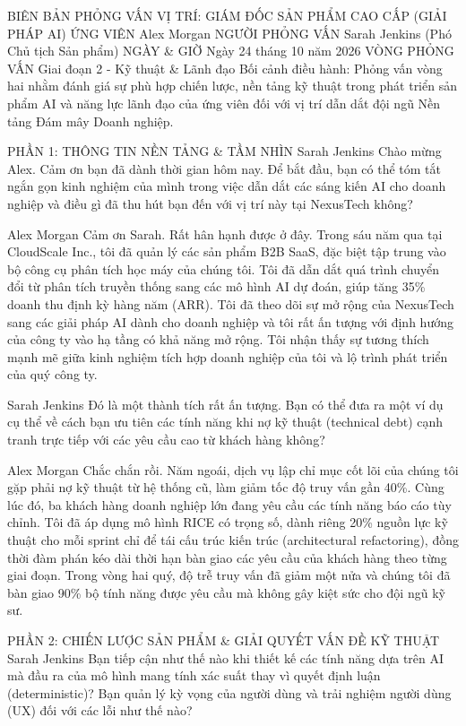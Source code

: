 \documentclass[12pt]{article}
\begin{document}
BIÊN BẢN PHỎNG VẤN
VỊ TRÍ: GIÁM ĐỐC SẢN PHẨM CAO CẤP (GIẢI PHÁP AI)
ỨNG VIÊN
Alex Morgan
NGƯỜI PHỎNG VẤN
Sarah Jenkins (Phó Chủ tịch Sản phẩm)
NGÀY \& GIỜ
Ngày 24 tháng 10 năm 2026
VÒNG PHỎNG VẤN
Giai đoạn 2 - Kỹ thuật \& Lãnh đạo
Bối cảnh điều hành: Phỏng vấn vòng hai nhằm đánh giá sự phù hợp chiến lược, nền tảng kỹ thuật trong phát triển sản phẩm AI và năng lực lãnh đạo của ứng viên đối với vị trí dẫn dắt đội ngũ Nền tảng Đám mây Doanh nghiệp.

PHẦN 1: THÔNG TIN NỀN TẢNG \& TẦM NHÌN
Sarah Jenkins
Chào mừng Alex. Cảm ơn bạn đã dành thời gian hôm nay. Để bắt đầu, bạn có thể tóm tắt ngắn gọn kinh nghiệm của mình trong việc dẫn dắt các sáng kiến AI cho doanh nghiệp và điều gì đã thu hút bạn đến với vị trí này tại NexusTech không?

Alex Morgan
Cảm ơn Sarah. Rất hân hạnh được ở đây. Trong sáu năm qua tại CloudScale Inc., tôi đã quản lý các sản phẩm B2B SaaS, đặc biệt tập trung vào bộ công cụ phân tích học máy của chúng tôi. Tôi đã dẫn dắt quá trình chuyển đổi từ phân tích truyền thống sang các mô hình AI dự đoán, giúp tăng 35\% doanh thu định kỳ hàng năm (ARR). Tôi đã theo dõi sự mở rộng của NexusTech sang các giải pháp AI dành cho doanh nghiệp và tôi rất ấn tượng với định hướng của công ty vào hạ tầng có khả năng mở rộng. Tôi nhận thấy sự tương thích mạnh mẽ giữa kinh nghiệm tích hợp doanh nghiệp của tôi và lộ trình phát triển của quý công ty.

Sarah Jenkins
Đó là một thành tích rất ấn tượng. Bạn có thể đưa ra một ví dụ cụ thể về cách bạn ưu tiên các tính năng khi nợ kỹ thuật (technical debt) cạnh tranh trực tiếp với các yêu cầu cao từ khách hàng không?

Alex Morgan
Chắc chắn rồi. Năm ngoái, dịch vụ lập chỉ mục cốt lõi của chúng tôi gặp phải nợ kỹ thuật từ hệ thống cũ, làm giảm tốc độ truy vấn gần 40\%. Cùng lúc đó, ba khách hàng doanh nghiệp lớn đang yêu cầu các tính năng báo cáo tùy chỉnh. Tôi đã áp dụng mô hình RICE có trọng số, dành riêng 20\% nguồn lực kỹ thuật cho mỗi sprint chỉ để tái cấu trúc kiến trúc (architectural refactoring), đồng thời đàm phán kéo dài thời hạn bàn giao các yêu cầu của khách hàng theo từng giai đoạn. Trong vòng hai quý, độ trễ truy vấn đã giảm một nửa và chúng tôi đã bàn giao 90\% bộ tính năng được yêu cầu mà không gây kiệt sức cho đội ngũ kỹ sư.

PHẦN 2: CHIẾN LƯỢC SẢN PHẨM \& GIẢI QUYẾT VẤN ĐỀ KỸ THUẬT
Sarah Jenkins
Bạn tiếp cận như thế nào khi thiết kế các tính năng dựa trên AI mà đầu ra của mô hình mang tính xác suất thay vì quyết định luận (deterministic)? Bạn quản lý kỳ vọng của người dùng và trải nghiệm người dùng (UX) đối với các lỗi như thế nào?
\end{document}
